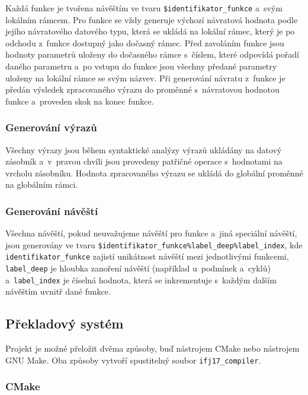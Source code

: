 \documentclass[a4paper, 11pt]{article}
\begin{document}
	Každá funkce je tvořena návěštím ve tvaru \texttt{\$identifikator\_funkce} a~svým lokálním rámcem.
	Pro funkce se vždy generuje výchozí návratová hodnota podle jejího návratového datového typu,
	která se ukládá na lokální rámec, který je po odchodu z~funkce dostupný jako dočasný rámec.
	Před zavoláním funkce jsou hodnoty parametrů uloženy do dočasného rámce s~číslem, které
	odpovídá pořadí daného parametru a~po vstupu do funkce jsou všechny předané parametry uloženy na
	lokální rámce se svým názvev. Při generování návratu z~funkce je předán výsledek zpracovaného
	výrazu do proměnné s~návratovou hodnotou funkce a~proveden skok na konec funkce.

	\subsubsection{Generování výrazů}

	Všechny výrazy jsou během syntaktické analýzy výrazů ukládány na datový zásobník a~v~pravou
	chvíli jsou provedeny patřičné operace s~hodnotami na vrcholu zásobníku. Hodnota zpracovaného
	výrazu se ukládá do globální proměnné na globálním rámci.

	\subsubsection{Generování návěští}

	Všechna návěští, pokud neuvažujeme návěští pro funkce a~jiná speciální návěští, jsou generovány
	ve tvaru \texttt{\$identifikator\_funkce\%label\_deep\%label\_index}, kde
	\texttt{identifikator\_funkce} zajistí unikátnost návěští mezi jednotlivými funkcemi,
	\texttt{label\_deep} je hloubka zanoření návěští (například u~podmínek a~cyklů)
	a~\texttt{label\_index} je číselná hodnota, která se inkrementuje s~každým dalším návěštím uvnitř
	dané funkce.


	\subsection{Překladový systém}

	Projekt je možné přeložit dvěma způsoby, buď nástrojem CMake nebo nástrojem GNU Make. Oba způsoby vytvoří
	spustitelný soubor \texttt{ifj17\_compiler}.

	\subsubsection{CMake}
\end{document}
